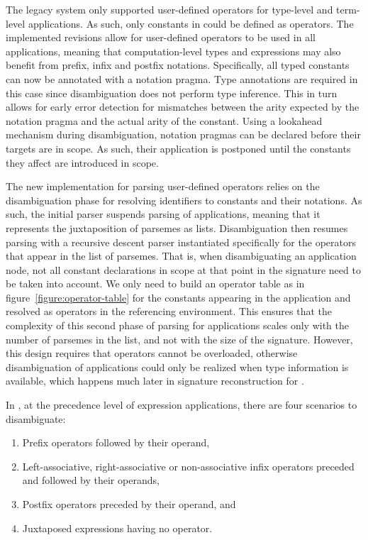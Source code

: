 The legacy \Beluga system only supported user-defined operators for \LF type-level and term-level applications.
As such, only constants in \LF could be defined as operators.
The implemented revisions allow for user-defined operators to be used in all applications, meaning that computation-level types and expressions may also benefit from prefix, infix and postfix notations.
Specifically, all typed constants can now be annotated with a notation pragma.
Type annotations are required in this case since disambiguation does not perform type inference.
This in turn allows for early error detection for mismatches between the arity expected by the notation pragma and the actual arity of the constant.
Using a lookahead mechanism during disambiguation, notation pragmas can be declared before their targets are in scope.
As such, their application is postponed until the constants they affect are introduced in scope.

The new implementation for parsing user-defined operators relies on the disambiguation phase for resolving identifiers to constants and their notations.
As such, the initial parser suspends parsing of applications, meaning that it represents the juxtaposition of parsemes as lists.
Disambiguation then resumes parsing with a recursive descent parser instantiated specifically for the operators that appear in the list of parsemes.
That is, when disambiguating an application node, not all constant declarations in scope at that point in the \Beluga signature need to be taken into account.
We only need to build an operator table as in figure~\ref{figure:operator-table} for the constants appearing in the application and resolved as operators in the referencing environment.
This ensures that the complexity of this second phase of parsing for applications scales only with the number of parsemes in the list, and not with the size of the signature.
However, this design requires that operators cannot be overloaded, otherwise disambiguation of applications could only be realized when type information is available, which happens much later in signature reconstruction for \Beluga.

In \Beluga, at the precedence level of expression applications, there are four scenarios to disambiguate:
\begin{enumerate}
\item Prefix operators followed by their operand,
\item Left-associative, right-associative or non-associative infix operators preceded and followed by their operands,
\item Postfix operators preceded by their operand, and
\item Juxtaposed expressions having no operator.
\end{enumerate}

